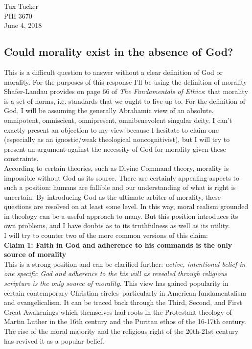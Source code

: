 \documentclass[a4paper, 11pt]{article}
\begin{document}
\noindent
\large
\begin{flushright}
Tux Tucker \\
PHI 3670 \\ 
June 4, 2018 \\
\end{flushright}

\begin{center}\section*{Could morality exist in the absence of God?}\end{center} 

This is a difficult question to answer without a clear definition of God or morality. For the purposes of this response I'll be using the definition of morality Shafer-Landau provides on page 66 of \textit{The Fundamentals of Ethics}: that morality is a set of norms, i.e. standards that we ought to live up to. For the definition of God, I will be assuming the generally Abrahamic view of an absolute, omnipotent, omniscient, omnipresent, omnibenevolent singular deity. I can't exactly present an objection to my view because I hesitate to claim one (especially as an ignostic/weak theological noncognitivist), but I will try to present an argument against the necessity of God for morality given these constraints. \\

According to certain theories, such as Divine Command theory, morality is impossible without God as its source. There are certainly appealing aspects to such a position: humans are fallible and our understanding of what is right is uncertain. By introducing God as the ultimate arbiter of morality, these questions are resolved on at least some level. In this way, moral realism grounded in theology can be a useful approach to many. But this position introduces its own problems, and I have doubts as to its truthfulness as well as its utility. \\

I will try to counter two of the more common versions of this claim: \\

\noindent\textbf{Claim 1: Faith in God and adherence to his commands is the only source of morality} \\

This is a strong position and can be clarified further: \textit{active, intentional belief in one specific God and adherence to the his will as revealed through religious scripture is the only source of morality.} This view has gained popularity in certain contemporary Christian circles--particularly in American fundamentalism and evangelicalism. It can be traced back through the Third, Second, and First Great Awakenings which themselves had roots in the Protestant theology of Martin Luther in the 16th century and the Puritan ethos of the 16-17th century. The rise of the moral majority and the religious right of the 20th-21st century has revived it as a popular belief. \\
\end{document}
